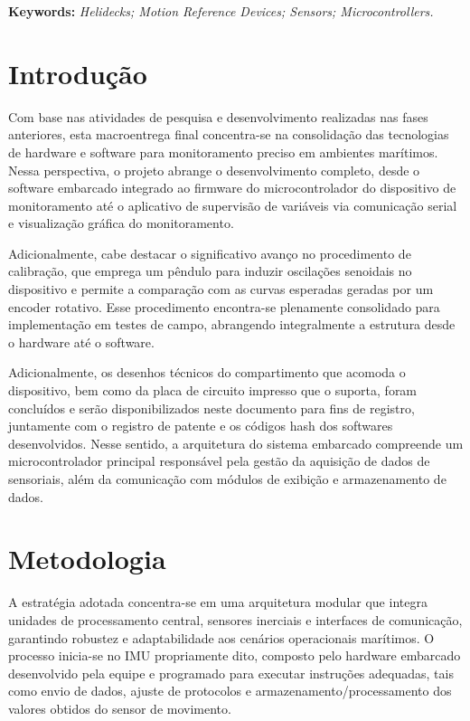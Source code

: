 \documentclass[a4paper, 12pt]{article}
\begin{document}
\vspace{.15cm}
\noindent
\textbf{Keywords:} \textit{Helidecks; Motion Reference Devices; Sensors; Microcontrollers.}

\newpage
\section{Introdução}
    Com base nas atividades de pesquisa e desenvolvimento realizadas nas fases anteriores, esta macroentrega final concentra-se na consolidação das tecnologias de hardware e software para monitoramento preciso em ambientes marítimos. Nessa perspectiva, o projeto abrange o desenvolvimento completo, desde o software embarcado integrado ao firmware do microcontrolador do dispositivo de monitoramento até o aplicativo de supervisão de variáveis via comunicação serial e visualização gráfica do monitoramento. 

    Adicionalmente, cabe destacar o significativo avanço no procedimento de calibração, que emprega um pêndulo para induzir oscilações senoidais no dispositivo e permite a comparação com as curvas esperadas geradas por um encoder rotativo. Esse procedimento encontra-se plenamente consolidado para implementação em testes de campo, abrangendo integralmente a estrutura desde o hardware até o software.
    
    Adicionalmente, os desenhos técnicos do compartimento que acomoda o dispositivo, bem como da placa de circuito impresso que o suporta, foram concluídos e serão disponibilizados neste documento para fins de registro, juntamente com o registro de patente e os códigos hash dos softwares desenvolvidos. Nesse sentido, a arquitetura do sistema embarcado compreende um microcontrolador principal responsável pela gestão da aquisição de dados de sensoriais, além da comunicação com módulos de exibição e armazenamento de dados.
    
\newpage
\section{Metodologia}
    A estratégia adotada concentra-se em uma arquitetura modular que integra unidades de processamento central, sensores inerciais e interfaces de comunicação, garantindo robustez e adaptabilidade aos cenários operacionais marítimos. O processo inicia-se no IMU propriamente dito, composto pelo hardware embarcado desenvolvido pela equipe e programado para executar instruções adequadas, tais como envio de dados, ajuste de protocolos e armazenamento/processamento dos valores obtidos do sensor de movimento.
\end{document}
